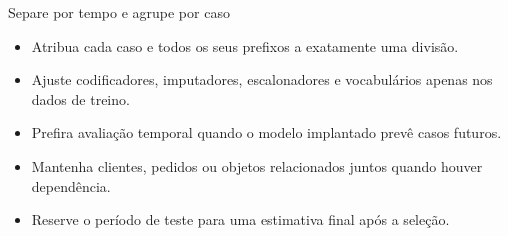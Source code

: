 \documentclass[aspectratio=169,11pt]{beamer}
\begin{document}
\begin{frame}{Separe por tempo e agrupe por caso}
  \centering
  \vspace{0.45cm}
  \begin{itemize}
    \item Atribua cada caso e todos os seus prefixos a exatamente uma divisão.
    \item Ajuste codificadores, imputadores, escalonadores e vocabulários apenas nos dados de treino.
    \item Prefira avaliação temporal quando o modelo implantado prevê casos futuros.
    \item Mantenha clientes, pedidos ou objetos relacionados juntos quando houver dependência.
    \item Reserve o período de teste para uma estimativa final após a seleção.
  \end{itemize}
\end{frame}
\end{document}
